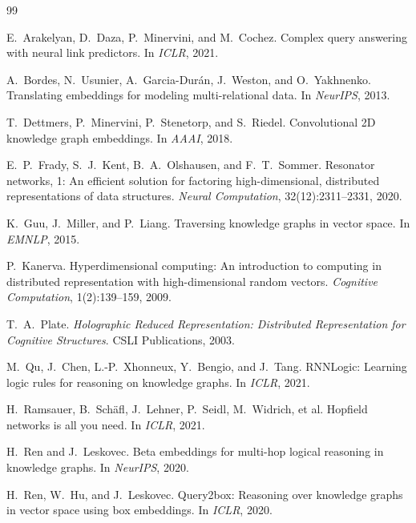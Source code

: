 \documentclass[11pt]{article}
\theoremstyle{definition}
\begin{document}
\begin{thebibliography}{99}

E.~Arakelyan, D.~Daza, P.~Minervini, and M.~Cochez.
\newblock Complex query answering with neural link predictors.
\newblock In \emph{ICLR}, 2021.

A.~Bordes, N.~Usunier, A.~Garcia-Dur\'an, J.~Weston, and O.~Yakhnenko.
\newblock Translating embeddings for modeling multi-relational data.
\newblock In \emph{NeurIPS}, 2013.

T.~Dettmers, P.~Minervini, P.~Stenetorp, and S.~Riedel.
\newblock Convolutional 2D knowledge graph embeddings.
\newblock In \emph{AAAI}, 2018.

E.~P.~Frady, S.~J.~Kent, B.~A.~Olshausen, and F.~T.~Sommer.
\newblock Resonator networks, 1: An efficient solution for factoring
high-dimensional, distributed representations of data structures.
\newblock \emph{Neural Computation}, 32(12):2311--2331, 2020.

K.~Guu, J.~Miller, and P.~Liang.
\newblock Traversing knowledge graphs in vector space.
\newblock In \emph{EMNLP}, 2015.

P.~Kanerva.
\newblock Hyperdimensional computing: An introduction to computing in
distributed representation with high-dimensional random vectors.
\newblock \emph{Cognitive Computation}, 1(2):139--159, 2009.

T.~A.~Plate.
\newblock \emph{Holographic Reduced Representation: Distributed Representation
for Cognitive Structures}.
\newblock CSLI Publications, 2003.

M.~Qu, J.~Chen, L.-P.~Xhonneux, Y.~Bengio, and J.~Tang.
\newblock RNNLogic: Learning logic rules for reasoning on knowledge graphs.
\newblock In \emph{ICLR}, 2021.

H.~Ramsauer, B.~Sch\"afl, J.~Lehner, P.~Seidl, M.~Widrich, et al.
\newblock Hopfield networks is all you need.
\newblock In \emph{ICLR}, 2021.

H.~Ren and J.~Leskovec.
\newblock Beta embeddings for multi-hop logical reasoning in knowledge graphs.
\newblock In \emph{NeurIPS}, 2020.

H.~Ren, W.~Hu, and J.~Leskovec.
\newblock Query2box: Reasoning over knowledge graphs in vector space using box
embeddings.
\newblock In \emph{ICLR}, 2020.


\end{thebibliography}
\end{document}

